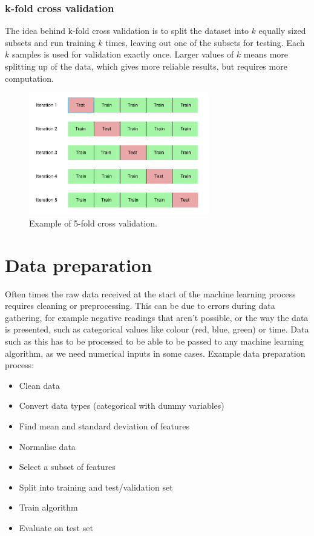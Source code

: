 \documentclass[CS5104-Notes.tex]{subfiles}
\begin{document}
\subsubsection{k-fold cross validation}
The idea behind k-fold cross validation is to split the dataset into $k$ equally sized subsets and run training $k$ times, leaving out one of the subsets for testing. Each $k$ samples is used for validation exactly once. Larger values of $k$ means more splitting up of the data, which gives more reliable results, but requires more computation.
\begin{figure}[H]
\centering
\includegraphics[width=0.7\textwidth, keepaspectratio]{imgs/k-fold-cross-validation.png}
\caption{Example of 5-fold cross validation.}
\end{figure}

\section{Data preparation}
Often times the raw data received at the start of the machine learning process requires cleaning or preprocessing. This can be due to errors during data gathering, for example negative readings that aren't possible, or the way the data is presented, such as categorical values like colour (red, blue, green) or time. Data such as this has to be processed to be able to be passed to any machine learning algorithm, as we need numerical inputs in some cases.
\n
Example data preparation process:
\begin{itemize}
\item Clean data
\item Convert data types (categorical with dummy variables)
\item Find mean and standard deviation of features
\item Normalise data
\item Select a subset of features
\item Split into training and test/validation set
\item Train algorithm
\item Evaluate on test set
\end{itemize}
\end{document}
